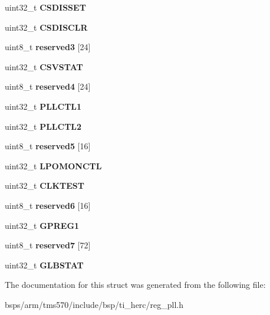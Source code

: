 \begin{DoxyCompactItemize}
uint32\+\_\+t {\bfseries C\+S\+D\+I\+S\+S\+ET}
\item 
\mbox{\label{structtms570__pll__t_a5c6cce5ddc853989f93c507b4e7e11df}} 
uint32\+\_\+t {\bfseries C\+S\+D\+I\+S\+C\+LR}
\item 
\mbox{\label{structtms570__pll__t_a0133bb52c2c8e5e0015e25def25652fb}} 
uint8\+\_\+t {\bfseries reserved3} \mbox{[}24\mbox{]}
\item 
\mbox{\label{structtms570__pll__t_ac8dff74576189c2e2c3cdbeba5eb0914}} 
uint32\+\_\+t {\bfseries C\+S\+V\+S\+T\+AT}
\item 
\mbox{\label{structtms570__pll__t_ab934022d87d0d2c825fa53beab7cf5ba}} 
uint8\+\_\+t {\bfseries reserved4} \mbox{[}24\mbox{]}
\item 
\mbox{\label{structtms570__pll__t_ae6bfc543092e62be44311e12b112d5b2}} 
uint32\+\_\+t {\bfseries P\+L\+L\+C\+T\+L1}
\item 
\mbox{\label{structtms570__pll__t_a3874b08e8c947784b48f6f253f8d841c}} 
uint32\+\_\+t {\bfseries P\+L\+L\+C\+T\+L2}
\item 
\mbox{\label{structtms570__pll__t_a89a57f0cc7da4bfdc8635aad7445460c}} 
uint8\+\_\+t {\bfseries reserved5} \mbox{[}16\mbox{]}
\item 
\mbox{\label{structtms570__pll__t_a402a9bfb26f764c4fce1d291e95c5dc9}} 
uint32\+\_\+t {\bfseries L\+P\+O\+M\+O\+N\+C\+TL}
\item 
\mbox{\label{structtms570__pll__t_a47dee3cbf71e8761b4fc22a2fac73d93}} 
uint32\+\_\+t {\bfseries C\+L\+K\+T\+E\+ST}
\item 
\mbox{\label{structtms570__pll__t_a75c94d73f413ef7589190bd615bd46b9}} 
uint8\+\_\+t {\bfseries reserved6} \mbox{[}16\mbox{]}
\item 
\mbox{\label{structtms570__pll__t_a9d8ca5f425b629f473e54537c4550566}} 
uint32\+\_\+t {\bfseries G\+P\+R\+E\+G1}
\item 
\mbox{\label{structtms570__pll__t_a925e509ae2f06a1427f2a99ea592f51d}} 
uint8\+\_\+t {\bfseries reserved7} \mbox{[}72\mbox{]}
\item 
\mbox{\label{structtms570__pll__t_ad9003e3947a7f688c49be128d7b1d4f8}} 
uint32\+\_\+t {\bfseries G\+L\+B\+S\+T\+AT}
\end{DoxyCompactItemize}


The documentation for this struct was generated from the following file\+:\begin{DoxyCompactItemize}
\item 
bsps/arm/tms570/include/bsp/ti\+\_\+herc/reg\+\_\+pll.\+h\end{DoxyCompactItemize}
